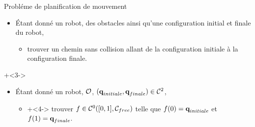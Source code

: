 \begin{frame}{Probl\'eme de planification de mouvement}
  \begin{itemize}
    \item \'Etant donn\'e un robot, des obstacles ainsi qu'une configuration initial et finale du robot,
      \begin{itemize}
        \item<2-> trouver un chemin sans collision allant de la configuration initiale à la configuration finale.
      \end{itemize}
  \end{itemize}
  \onslide+<3->{
    \begin{itemize}
      \item \'Etant donn\'e un robot, ${\cal O}$, $(\textbf{q}_{initiale}, \textbf{q}_{finale})\in{\cal C}^2$,
        \begin{itemize}
          \item \onslide+<4-> {trouver $f\in\mathcal{C}^0([0,1], {\cal C}_{free})$ telle que $f(0) = \textbf{q}_{initiale}$ et $f(1) = \textbf{q}_{finale}$.}
        \end{itemize}
    \end{itemize}
  }
\end{frame}
